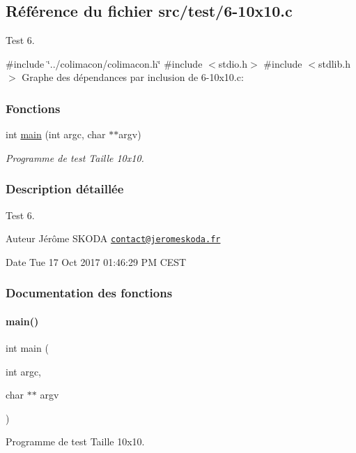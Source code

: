 \hypertarget{6-10x10_8c}{}\subsection{Référence du fichier src/test/6-\/10x10.c}
\label{6-10x10_8c}


Test 6.  


{\ttfamily \#include \char`\"{}../colimacon/colimacon.\+h\char`\"{}}\newline
{\ttfamily \#include $<$stdio.\+h$>$}\newline
{\ttfamily \#include $<$stdlib.\+h$>$}\newline
Graphe des dépendances par inclusion de 6-\/10x10.c\+:
\subsubsection*{Fonctions}
\begin{DoxyCompactItemize}
\item 
int \hyperlink{6-10x10_8c_a3c04138a5bfe5d72780bb7e82a18e627}{main} (int argc, char $\ast$$\ast$argv)
\begin{DoxyCompactList}\small\item\em Programme de test Taille 10x10. \end{DoxyCompactList}\end{DoxyCompactItemize}


\subsubsection{Description détaillée}
Test 6. 

\begin{DoxyAuthor}{Auteur}
Jérôme S\+K\+O\+DA \href{mailto:contact@jeromeskoda.fr}{\tt contact@jeromeskoda.\+fr} 
\end{DoxyAuthor}
\begin{DoxyDate}{Date}
Tue 17 Oct 2017 01\+:46\+:29 PM C\+E\+ST 
\end{DoxyDate}


\subsubsection{Documentation des fonctions}
\mbox{\label{6-10x10_8c_a3c04138a5bfe5d72780bb7e82a18e627}} 
\paragraph{\texorpdfstring{main()}{main()}}
{\footnotesize\ttfamily int main (\begin{DoxyParamCaption}\item[{int}]{argc,  }\item[{char $\ast$$\ast$}]{argv }\end{DoxyParamCaption})}



Programme de test Taille 10x10. 

